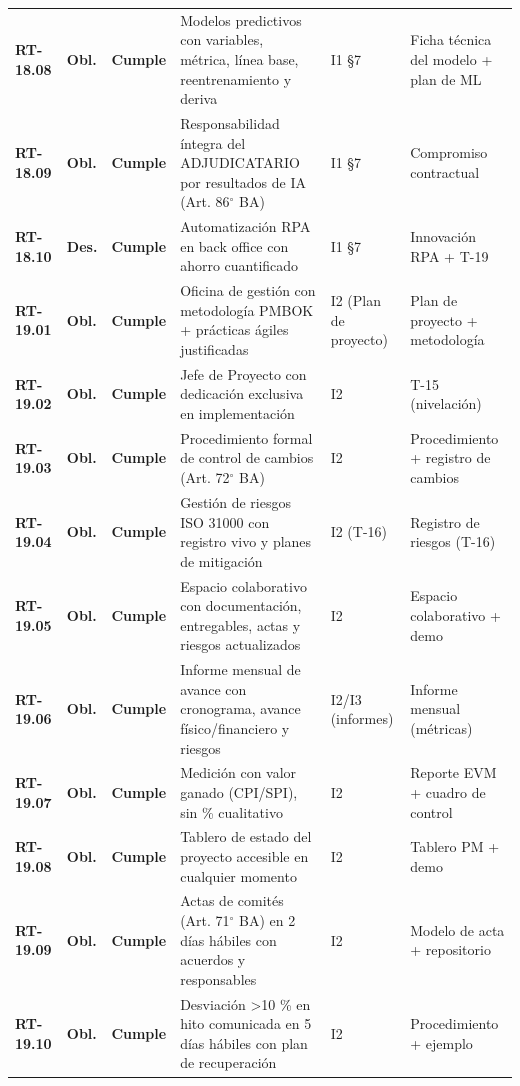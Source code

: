 \begin{small}
\begin{longtable}{@{}p{1.35cm} p{1.15cm} p{1.15cm} p{4.6cm} p{2.35cm} p{3.8cm}@{}}
\textbf{RT-18.08} & \textbf{Obl.} & \textbf{Cumple} & Modelos predictivos con variables, m\'etrica, l\'inea base, reentrenamiento y deriva & I1 §7 & Ficha t\'ecnica del modelo + plan de ML \\
\textbf{RT-18.09} & \textbf{Obl.} & \textbf{Cumple} & Responsabilidad \'integra del ADJUDICATARIO por resultados de IA (Art. 86$^{\circ}$ BA) & I1 §7 & Compromiso contractual \\
\textbf{RT-18.10} & \textbf{Des.} & \textbf{Cumple} & Automatizaci\'on RPA en back office con ahorro cuantificado & I1 §7 & Innovaci\'on RPA + T-19 \\
\textbf{RT-19.01} & \textbf{Obl.} & \textbf{Cumple} & Oficina de gesti\'on con metodolog\'ia PMBOK + pr\'acticas \'agiles justificadas & I2 (Plan de proyecto) & Plan de proyecto + metodolog\'ia \\
\textbf{RT-19.02} & \textbf{Obl.} & \textbf{Cumple} & Jefe de Proyecto con dedicaci\'on exclusiva en implementaci\'on & I2 & T-15 (nivelaci\'on) \\
\textbf{RT-19.03} & \textbf{Obl.} & \textbf{Cumple} & Procedimiento formal de control de cambios (Art. 72$^{\circ}$ BA) & I2 & Procedimiento + registro de cambios \\
\textbf{RT-19.04} & \textbf{Obl.} & \textbf{Cumple} & Gesti\'on de riesgos ISO 31000 con registro vivo y planes de mitigaci\'on & I2 (T-16) & Registro de riesgos (T-16) \\
\textbf{RT-19.05} & \textbf{Obl.} & \textbf{Cumple} & Espacio colaborativo con documentaci\'on, entregables, actas y riesgos actualizados & I2 & Espacio colaborativo + demo \\
\textbf{RT-19.06} & \textbf{Obl.} & \textbf{Cumple} & Informe mensual de avance con cronograma, avance f\'isico/financiero y riesgos & I2/I3 (informes) & Informe mensual (m\'etricas) \\
\textbf{RT-19.07} & \textbf{Obl.} & \textbf{Cumple} & Medici\'on con valor ganado (CPI/SPI), sin \% cualitativo & I2 & Reporte EVM + cuadro de control \\
\textbf{RT-19.08} & \textbf{Obl.} & \textbf{Cumple} & Tablero de estado del proyecto accesible en cualquier momento & I2 & Tablero PM + demo \\
\textbf{RT-19.09} & \textbf{Obl.} & \textbf{Cumple} & Actas de comit\'es (Art. 71$^{\circ}$ BA) en 2 d\'ias h\'abiles con acuerdos y responsables & I2 & Modelo de acta + repositorio \\
\textbf{RT-19.10} & \textbf{Obl.} & \textbf{Cumple} & Desviaci\'on >10 \% en hito comunicada en 5 d\'ias h\'abiles con plan de recuperaci\'on & I2 & Procedimiento + ejemplo \\

\end{longtable}
\end{small}
